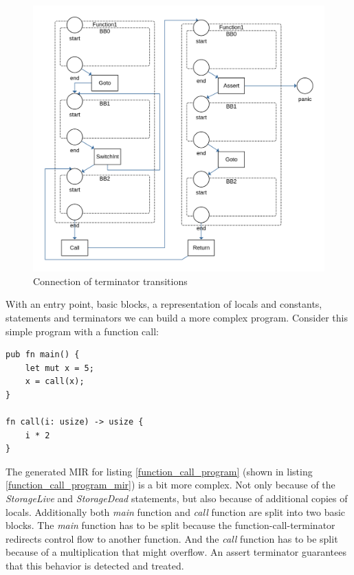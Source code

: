 \begin{figure}
    \centering
    \includegraphics[width=.8\textwidth]{../diagrams/TerminatorsNet.png}
    \caption{Connection of terminator transitions}
    \label{terminators_net}
\end{figure}

With an entry point, basic blocks, a representation of locals and constants, statements and terminators we can build a more complex program.
Consider this simple program with a function call:
\begin{lstlisting}
pub fn main() {
    let mut x = 5;
    x = call(x);
}

fn call(i: usize) -> usize {
    i * 2
}
\end{lstlisting}
The generated MIR for listing \ref{function_call_program} (shown in listing \ref{function_call_program_mir}) is a bit more complex.
Not only because of the \textit{StorageLive} and \textit{StorageDead} statements, but also because of additional copies of locals.
Additionally both \textit{main} function and \textit{call} function are split into two basic blocks.
The \textit{main} function has to be split because the function-call-terminator redirects control flow to another function.
And the \textit{call} function has to be split because of a multiplication that might overflow.
An assert terminator guarantees that this behavior is detected and treated.

